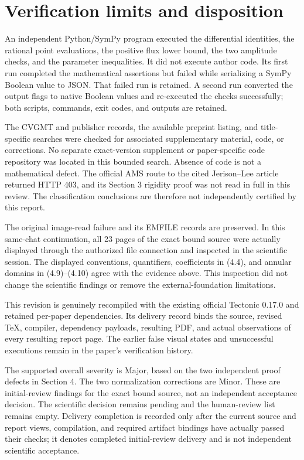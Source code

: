 \documentclass[10pt]{article}
\begin{document}
\section*{Verification limits and disposition}
An independent Python/SymPy program executed the differential identities, the rational point evaluations, the positive flux lower bound, the two amplitude checks, and the parameter inequalities. It did not execute author code. Its first run completed the mathematical assertions but failed while serializing a SymPy Boolean value to JSON. That failed run is retained. A second run converted the output flags to native Boolean values and re-executed the checks successfully; both scripts, commands, exit codes, and outputs are retained.\par
The CVGMT and publisher records, the available preprint listing, and title-specific searches were checked for associated supplementary material, code, or corrections. No separate exact-version supplement or paper-specific code repository was located in this bounded search. Absence of code is not a mathematical defect. The official AMS route to the cited Jerison–Lee article returned HTTP 403, and its Section 3 rigidity proof was not read in full in this review. The classification conclusions are therefore not independently certified by this report.\par
The original image-read failure and its EMFILE records are preserved. In this same-chat continuation, all 23 pages of the exact bound source were actually displayed through the authorized file connection and inspected in the scientific session. The displayed conventions, quantifiers, coefficients in (4.4), and annular domains in (4.9)–(4.10) agree with the evidence above. This inspection did not change the scientific findings or remove the external-foundation limitations.\par
This revision is genuinely recompiled with the existing official Tectonic 0.17.0 and retained per-paper dependencies. Its delivery record binds the source, revised TeX, compiler, dependency payloads, resulting PDF, and actual observations of every resulting report page. The earlier false visual states and unsuccessful executions remain in the paper’s verification history.\par
The supported overall severity is Major, based on the two independent proof defects in Section 4. The two normalization corrections are Minor. These are initial-review findings for the exact bound source, not an independent acceptance decision. The scientific decision remains pending and the human-review list remains empty. Delivery completion is recorded only after the current source and report views, compilation, and required artifact bindings have actually passed their checks; it denotes completed initial-review delivery and is not independent scientific acceptance.\par
\end{document}
